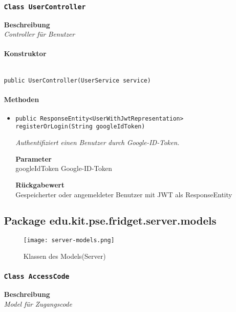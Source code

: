      \subsubsection{\texttt{Class UserController}}
     \textbf{Beschreibung} \\
     \textit{Controller für Benutzer}
     \paragraph*{Konstruktor}\mbox{} \\
     \texttt{public UserController(UserService service)} \\
     \paragraph*{Methoden}
     \begin{itemize}
     	\item{\texttt{public ResponseEntity<UserWithJwtRepresentation> registerOrLogin(String googleIdToken)}}
     	
     	\textit{Authentifiziert einen Benutzer durch Google-ID-Token.}
     	
     	\textbf{Parameter} \\
     	googleIdToken Google-ID-Token
     	
     	\textbf{Rückgabewert} \\
     	Gespeicherter oder angemeldeter Benutzer mit JWT als ResponseEntity
     \end{itemize}
     \subsection{Package edu.kit.pse.fridget.server.models}
     \begin{figure}[H]
	       \centering
	       \texttt{[image: server-models.png]}
	       \caption{Klassen des Models(Server)}
	      \end{figure}
     \subsubsection{\texttt{Class AccessCode}}
     \textbf{Beschreibung} \\
     \textit{Model für Zugangscode}
